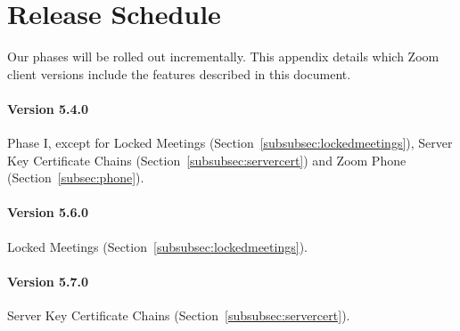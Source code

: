 \section{Release Schedule}
\label{appendix:releases}
Our phases will be rolled out incrementally. This appendix details which Zoom client versions include the features described in this document.

\paragraph{Version 5.4.0}
Phase I, except for Locked Meetings (Section~\ref{subsubsec:lockedmeetings}), Server Key Certificate Chains (Section~\ref{subsubsec:servercert}) and Zoom Phone (Section~\ref{subsec:phone}).

\paragraph{Version 5.6.0}
Locked Meetings (Section~\ref{subsubsec:lockedmeetings}).

\paragraph{Version 5.7.0}
Server Key Certificate Chains (Section~\ref{subsubsec:servercert}).
